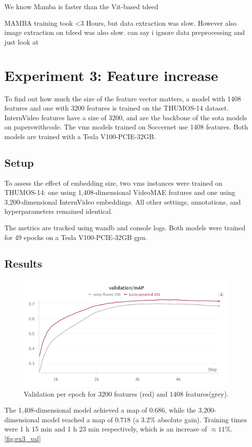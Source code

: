 We know Mamba is faster than the Vit-based tdeed

MAMBA training took <3 Hours, but data extraction was slow. However also image extraction on tdeed was also slow. can say i ignore data preprocessing and just look at 


\section{Experiment 3: Feature increase}
\label{sec:experiment3}
To find out how much the size of the feature vector matters, a model with 1408 features and one with 3200 features is trained on the THUMOS-14 dataset.
InternVideo features have a size of 3200, and are the backbone of the \acrshort{sota} models on paperswithcode. The \acrshort{vms} models trained on Soccernet use 1408 features. Both models are trained with a Tesla V100-PCIE-32GB.


\subsection{Setup}
\label{ssec:ex3_setup}

To assess the effect of embedding size, two \acrshort{vms} instances were trained on THUMOS-14\cite{dataset:thumos}: one using 1,408-dimensional VideoMAE features and one using 3,200-dimensional InternVideo embeddings. All other settings, annotations, and hyperparameters remained identical.

The metrics are tracked using \acrlong{wandb} and console logs.
Both models were trained for 49 epochs on a Tesla V100-PCIE-32GB \acrshort{gpu}.

\subsection{Results}
\label{ssec:ex3_results}

\begin{figure}
    \centering
    \includegraphics[width=0.75\linewidth]{figures/1408_3200_val.png}
    \caption{Validation per epoch for 3200 features (red) and 1408 features(grey). }
    \label{fig:ex3_val}
\end{figure}
The 1,408-dimensional model achieved a  \acrshort{map} of \(0.686\), while the 3,200-dimensional model reached a \acrshort{map} of \(0.718\) (a 3.2\% absolute gain). Training times were 1 h 15 min and 1 h 23 min respectively, which is an increase of \(\approx11\%\). \autoref{fig:ex3_val} 


